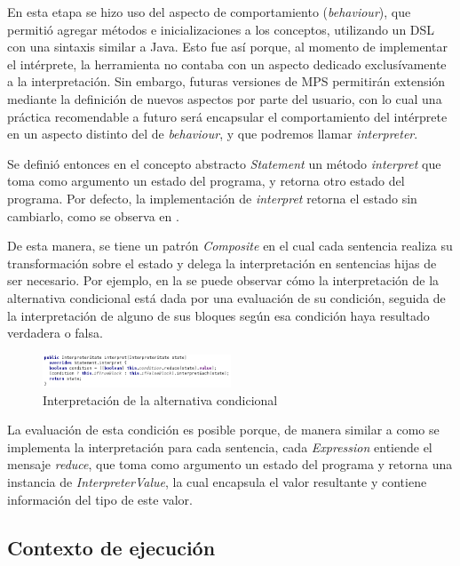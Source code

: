 En esta etapa se hizo uso del aspecto de comportamiento (\textit{behaviour}), que permitió agregar métodos e inicializaciones a los conceptos, utilizando un DSL con una sintaxis similar a Java. Esto fue así porque, al momento de implementar el intérprete, la herramienta no contaba con un aspecto dedicado exclusívamente a la interpretación. Sin embargo, futuras versiones de MPS permitirán extensión mediante la definición de nuevos aspectos por parte del usuario, con lo cual una práctica recomendable a futuro será encapsular el comportamiento del intérprete en un aspecto distinto del de \textit{behaviour}, y que podremos llamar \textit{interpreter}.

Se definió entonces en el concepto abstracto \textit{Statement} un método \textit{interpret} que toma como argumento un estado del programa, y retorna otro estado del programa. Por defecto, la implementación de \textit{interpret} retorna el estado sin cambiarlo, como se observa en .




De esta manera, se tiene un patrón \textit{Composite}\cite{Gamma} en el cual cada sentencia realiza su transformación sobre el estado y delega la interpretación en sentencias hijas de ser necesario. Por ejemplo, en la  se puede observar cómo la interpretación de la alternativa condicional está dada por una evaluación de su condición, seguida de la interpretación de alguno de sus bloques según esa condición haya resultado verdadera o falsa.

\begin{figure}[hb]
\centering
\includegraphics[width=0.5\textwidth]{assets/behavior_ifElse}
\caption{Interpretación de la alternativa condicional}
\label{fig:behavior_ifElse}
\end{figure}

La evaluación de esta condición es posible porque, de manera similar a como se implementa la interpretación para cada sentencia, cada \textit{Expression} entiende el mensaje \textit{reduce}, que toma como argumento un estado del programa y retorna una instancia de \textit{InterpreterValue}, la cual encapsula el valor resultante y contiene información del tipo de este valor. 

\subsection{Contexto de ejecución}

